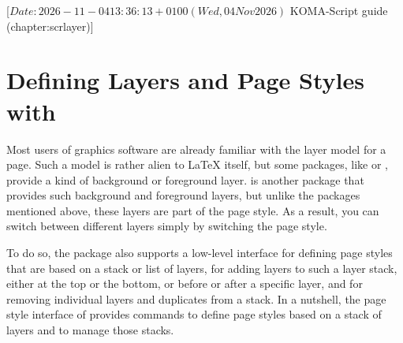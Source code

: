 %
%
%
%
%
%
%

                 [$Date: 2026-11-04 13:36:13 +0100 (Wed, 04 Nov 2026) $
                  KOMA-Script guide (chapter:scrlayer)]


\chapter[{Defining Layers and Page Styles with \Package{scrlayer}}]
  {Defining Layers and Page Styles with
	}

\BeginIndexGroup
{}%
%
Most users of graphics software are already familiar with the layer model for
a page. Such a model is rather alien to \LaTeX{} itself, but some packages,
like  or , provide a kind of
background or foreground layer.  is another package that
provides such background and foreground layers, but unlike the packages
mentioned above, these layers are part of the page style. As a result, you can
switch between different layers simply by switching the page style.

To do so, the package also supports a low-level interface for defining page
styles that are based on a stack or list of layers, for adding layers to such
a layer stack, either at the top or the bottom, or before or after a specific
layer, and for removing individual layers and duplicates from a stack. In a
nutshell, the page style interface of  provides commands to
define page styles based on a stack of layers and to manage those stacks.

